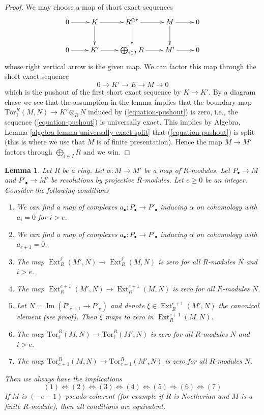 \documentclass{stacks-project}
\theoremstyle{plain}
\newtheorem{lemma}[subsection]{Lemma}
\theoremstyle{definition}
\theoremstyle{remark}
\numberwithin{equation}{subsection}
\def\Ext{\mathop{\mathrm{Ext}}\nolimits}
\def\Im{\mathop{\mathrm{Im}}}
\begin{document}
\begin{proof}
We may choose a map of short exact sequences
$$
\xymatrix{
0 \ar[r] &
K \ar[r] \ar[d] &
R^{\oplus r} \ar[r] \ar[d] &
M \ar[r] \ar[d] &
0 \\
0 \ar[r] &
K' \ar[r] &
\bigoplus_{i \in I} R \ar[r] &
M' \ar[r] &
0
}
$$
whose right vertical arrow is the given map.
We can factor this map through the short exact sequence
\begin{equation}
\label{equation-pushout}
0 \to K' \to E \to M \to 0
\end{equation}
which is the pushout of the first short exact sequence by $K \to K'$.
By a diagram chase we see that the assumption in the lemma
implies that the boundary map $\text{Tor}_1^R(M, N) \to K' \otimes_R N$
induced by (\ref{equation-pushout}) is zero, i.e., the sequence
(\ref{equation-pushout}) is universally exact. This implies by
Algebra, Lemma \ref{algebra-lemma-universally-exact-split}
that (\ref{equation-pushout}) is split (this is where we use that
$M$ is of finite presentation). Hence the map $M \to M'$
factors through $\bigoplus_{i \in I} R$ and we win.
\end{proof}

\begin{lemma}
\label{lemma-characterize-vanishing-tor-ext-above-e}
Let $R$ be a ring. Let $\alpha : M \to M'$ be a map of $R$-modules.
Let $P_\bullet \to M$ and $P'_\bullet \to M'$ be resolutions by
projective $R$-modules. Let $e \geq 0$ be an integer.
Consider the following conditions
\begin{enumerate}
\item We can find a map of complexes $a_\bullet : P_\bullet \to P'_\bullet$
inducing $\alpha$ on cohomology with $a_i = 0$ for $i > e$.
\item We can find a map of complexes $a_\bullet : P_\bullet \to P'_\bullet$
inducing $\alpha$ on cohomology with $a_{e + 1} = 0$.
\item The map $\Ext^i_R(M', N) \to \Ext^i_R(M, N)$ is zero
for all $R$-modules $N$ and $i > e$.
\item The map $\Ext^{e + 1}_R(M', N) \to \Ext^{e + 1}_R(M, N)$ is zero
for all $R$-modules $N$.
\item Let $N = \Im(P'_{e + 1} \to P'_e)$ and denote
$\xi \in \Ext^{e + 1}_R(M', N)$ the canonical element (see proof).
Then $\xi$ maps to zero in $\Ext^{e + 1}_R(M, N)$.
\item The map $\text{Tor}_i^R(M, N) \to \text{Tor}_i^R(M', N)$
is zero for all $R$-modules $N$ and $i > e$.
\item The map $\text{Tor}_{e + 1}^R(M, N) \to \text{Tor}_{e + 1}^R(M', N)$
is zero for all $R$-modules $N$.
\end{enumerate}
Then we always have the implications
$$
(1) \Leftrightarrow (2) \Leftrightarrow (3) \Leftrightarrow (4)
\Leftrightarrow (5) \Rightarrow (6) \Leftrightarrow (7)
$$
If $M$ is $(-e - 1)$-pseudo-coherent (for example if $R$ is Noetherian
and $M$ is a finite $R$-module), then all conditions
are equivalent.
\end{lemma}
\end{document}
